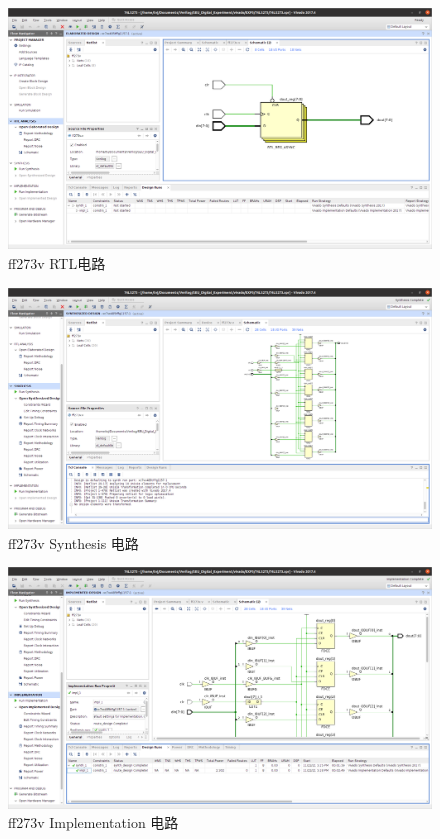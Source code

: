 \documentclass[11pt]{SEU-Digital-Report}
\begin{document}
      \begin{figure}[htbp]
        \centering
        \includegraphics[width=\linewidth]{fig/vivado/ff273v_RTL.png}
        \caption{ff273v RTL电路}
      \end{figure}
      \begin{figure}[htbp]
        \centering
        \includegraphics[width=\linewidth]{fig/vivado/ff273v_synthesis.png}
        \caption{ff273v Synthesis 电路}
        \label{fig:ff273v_synthesis}
      \end{figure}
      \begin{figure}[htbp]
        \centering
        \includegraphics[width=\linewidth]{fig/vivado/ff273v_implementation.png}
        \caption{ff273v Implementation 电路}
        \label{fig:ff273v_implementation}
      \end{figure}
\end{document}
